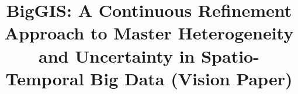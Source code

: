 \documentclass{sig-alternate-05-2015}
\begin{document}
\sloppy
\parindent 0pt







%
\title{BigGIS: A Continuous Refinement Approach to Master Heterogeneity and
Uncertainty in Spatio-Temporal Big Data (Vision Paper)}
%
%
%
%
%
\end{document}
